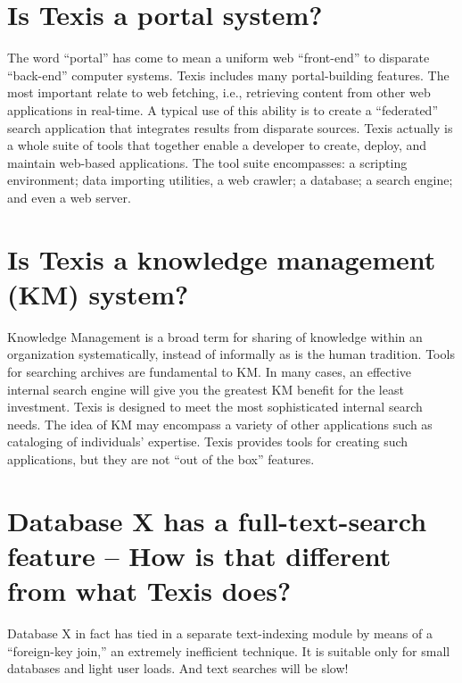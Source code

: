 \section{Is Texis a portal system? }

The word ``portal'' has come to mean a uniform web ``front-end'' to
disparate ``back-end'' computer systems.  Texis includes many
portal-building features.  The most important relate to web fetching,
i.e., retrieving content from other web applications in real-time.  A
typical use of this ability is to create a ``federated'' search
application that integrates results from disparate sources.  Texis
actually is a whole suite of tools that together enable a developer to
create, deploy, and maintain web-based applications. The tool suite
encompasses: a scripting environment; data importing utilities, a web
crawler; a database; a search engine; and even a web server.

\section{Is Texis a knowledge management (KM) system? }

Knowledge Management is a broad term for sharing of knowledge within
an organization systematically, instead of informally as is the human
tradition.  Tools for searching archives are fundamental to KM.  In
many cases, an effective internal search engine will give you the
greatest KM benefit for the least investment.  Texis is designed to
meet the most sophisticated internal search needs.  The idea of KM may
encompass a variety of other applications such as cataloging of
individuals' expertise.  Texis provides tools for creating such
applications, but they are not ``out of the box'' features.

\section{Database X has a full-text-search feature -- How is that different from what Texis does? }

Database X in fact has tied in a separate text-indexing module by
means of a ``foreign-key join,'' an extremely inefficient
technique. It is suitable only for small databases and light user
loads.  And text searches will be slow!

